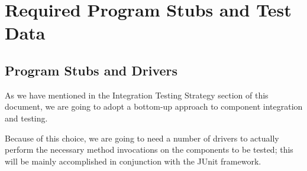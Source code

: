 \chapter{Required Program Stubs and Test Data}
\section{Program Stubs and Drivers}
As we have mentioned in the Integration Testing Strategy section of this document, we are going to adopt a bottom-up approach to component integration and testing.

Because of this choice, we are going to need a number of drivers to actually perform the necessary method invocations on the components to be tested; this will be mainly accomplished in conjunction with the JUnit framework. 


